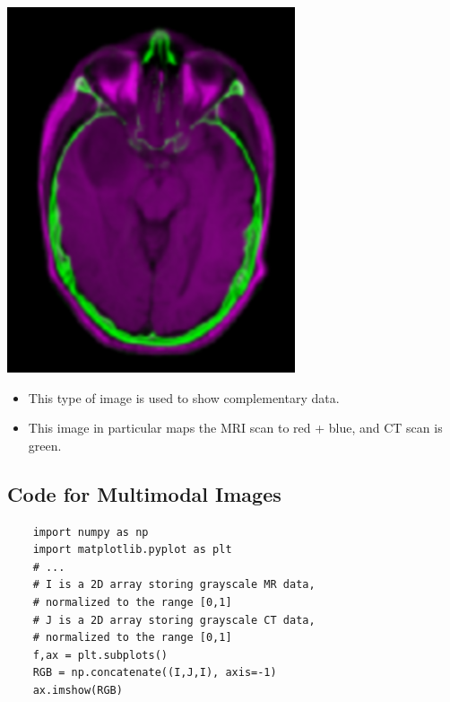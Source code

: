\documentclass[10pt]{article}
\begin{document}
\begin{center}
    \includegraphics[scale=1]{W1_10.png}
\end{center}
\begin{itemize}
    \item This type of image is used to show complementary data.
    \item This image in particular maps the MRI scan to red + blue, and CT scan is green.
\end{itemize}
\subsection*{Code for Multimodal Images}
\begin{verbatim}
    import numpy as np
    import matplotlib.pyplot as plt
    # ...
    # I is a 2D array storing grayscale MR data,
    # normalized to the range [0,1]
    # J is a 2D array storing grayscale CT data,
    # normalized to the range [0,1]
    f,ax = plt.subplots()
    RGB = np.concatenate((I,J,I), axis=-1)
    ax.imshow(RGB)
\end{verbatim}
\end{document}
